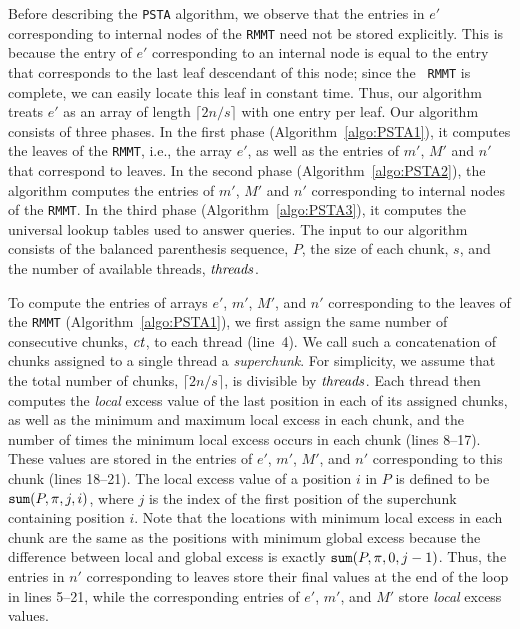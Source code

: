 Before describing the {\tt PSTA} algorithm, we observe
that the entries in $e'$ corresponding to internal nodes of the
{\tt RMMT} need not be stored explicitly.  This is because the entry
of $e'$ corresponding to an internal node is equal to the entry that
corresponds to the last leaf descendant of this node; since the {\tt
  RMMT} is complete, we can easily locate this leaf in constant
time.  Thus, our algorithm treats $e'$ as an
array of length $\lceil 2n / s\rceil$ with one entry per leaf.
Our algorithm consists of three phases. In the first
phase (Algorithm~\ref{algo:PSTA1}), it computes the leaves of the {\tt RMMT},
i.e., the array $e'$,
as well as the entries of $m'$, $M'$ and $n'$
that correspond to leaves.  In the second phase (Algorithm~\ref{algo:PSTA2}),
the algorithm computes the
entries of $m'$, $M'$ and $n'$ corresponding
to internal nodes of the {\tt RMMT}.
In the third phase (Algorithm~\ref{algo:PSTA3}), it computes the universal
lookup tables used to answer queries.
The input to our algorithm consists of the balanced parenthesis sequence,
$P$, the size of each chunk, $s$, and the number of available threads,
$\mathit{threads}$.

To compute the entries of arrays $e'$, $m'$, $M'$, and $n'$ corresponding
to the leaves of the {\tt RMMT} (Algorithm~\ref{algo:PSTA1}), we first
assign the same number of consecutive chunks, $\mathit{ct}$, to each thread (line~4).
We call such a concatenation of chunks assigned to a single thread
a \emph{superchunk}.
For simplicity, we assume that the total number of chunks,
$\lceil 2n / s\rceil$, is divisible by $\mathit{threads}$.
Each thread then computes the \emph{local} excess value of the last
position in each of its assigned chunks, as well as the minimum and
maximum local excess in each chunk, and the number of times the minimum
local excess occurs in each chunk (lines 8--17).
These values are stored in the entries of $e'$, $m'$, $M'$, and
$n'$ corresponding to this chunk (lines 18--21).
The local excess value of a position $i$ in $P$ is defined to be $\mathtt{sum}(P,\pi,j,i)$,
where $j$ is the index of the first position of the superchunk containing
position $i$.
Note that the locations with minimum local excess in each chunk are the same as
the positions with minimum global excess because the difference between local
and global excess is exactly $\mathtt{sum}(P,\pi,0,j-1)$.
Thus, the entries in $n'$ corresponding to leaves store their final values at the
end of the loop in lines 5--21, while the corresponding entries of $e'$, $m'$,
and $M'$ store \emph{local} excess values.

